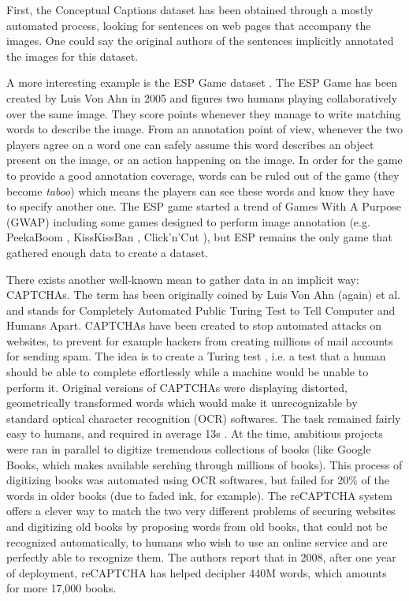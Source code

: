 First, the Conceptual Captions dataset \cite{sharma-etal-2018-conceptual} has been obtained through a mostly automated process, looking for sentences on web pages that accompany the images. One could say the original authors of the sentences implicitly annotated the images for this dataset. 


A more interesting example is the ESP Game dataset \cite{von2005esp}. The ESP Game has been created by Luis Von Ahn in 2005 and figures two humans playing collaboratively over the same image. They score points whenever they manage to write matching words to describe the image. From an annotation point of view, whenever the two players agree on a word one can safely assume this word describes an object present on the image, or an action happening on the image. In order for the game to provide a good annotation coverage, words can be ruled out of the game (they become \textit{taboo}) which means the players can see these words and know they have to specify another one. The ESP game started a trend of Games With A Purpose (GWAP) \cite{von2008designing} including some games designed to perform image annotation (e.g. PeekaBoom \cite{von2006peekaboom}, KissKissBan \cite{ho2010kisskissban}, Click'n'Cut \cite{carlier2014click}), but ESP remains the only game that gathered enough data to create a dataset. 


There exists another well-known mean to gather data in an implicit way: CAPTCHAs. The term has been originally coined by Luis Von Ahn (again) et al. \cite{von2003captcha} and stands for Completely Automated Public Turing Test to Tell Computer and Humans Apart. CAPTCHAs have been created to stop automated attacks on websites, to prevent for example hackers from creating millions of mail accounts for sending spam. The idea is to create a Turing test \cite{machinery1950computing}, i.e. a test that a human should be able to complete effortlessly while a machine would be unable to perform it. Original versions of CAPTCHAs were displaying distorted, geometrically transformed words which would make it unrecognizable by standard optical character recognition (OCR) softwares. The task remained fairly easy to humans, and required in average 13s \cite{von2008recaptcha}. At the time, ambitious projects were ran in parallel to digitize tremendous collections of books (like Google Books, which makes available serching through millions of books). This process of digitizing books was automated using OCR softwares, but failed for 20\% of the words in older books (due to faded ink, for example). The reCAPTCHA system offers a clever way to match the two very different problems of securing websites and digitizing old books by proposing words from old books, that could not be recognized automatically, to humans who wish to use an online service and are perfectly able to recognize them. The authors report that in 2008, after one year of deployment, reCAPTCHA has helped decipher 440M words, which amounts for more 17,000 books.

